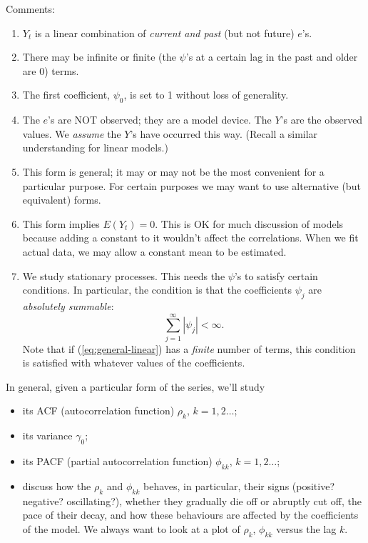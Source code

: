 \documentclass[12pt]{article}
\begin{document}
Comments:
\begin{enumerate}
\item
$Y_t$ is a linear combination of \emph{current and past} (but not
    future) $e$'s.

\item There may be infinite or finite
    (the $\psi$'s at a certain lag in the past and older are 0) terms.

\item The first coefficient, $\psi_0$, is set to 1 without loss of
    generality.

\item The $e$'s are NOT observed; they are a model device.
   The $Y$'s are the observed values.
   We \emph{assume} the $Y$'s have occurred this way.
   (Recall a similar understanding for linear models.)

\item This form is general; it may or may not be the most convenient for a
    particular purpose. For certain purposes we may want to use
    alternative (but equivalent) forms.

\item This form implies $E(Y_t) = 0$.
   This is OK for much discussion of models because adding a constant to it
   wouldn't affect the correlations.
   When we fit actual data, we may allow a constant mean to be
   estimated.

\item We study stationary processes.
   This needs the $\psi$'s to satisfy certain conditions.
   In particular, the condition is that
   the coefficients $\psi_j$ are \emph{absolutely summable}:
   \[
   \sum_{j=1}^\infty |\psi_j| < \infty.
   \]
   Note that
   if (\ref{eq:general-linear}) has a \emph{finite} number of terms,
   this condition is satisfied with whatever values of the coefficients.
\end{enumerate}

In general, given a particular form of the series, we'll study
\begin{itemize}
\item its ACF (autocorrelation function)  $\rho_k$, $k=1,2\dotsc$;
\item its variance $\gamma_0$;
\item its PACF (partial autocorrelation function)  $\phi_{kk}$, $k=1,2\dotsc$;
\item discuss how the $\rho_k$ and $\phi_{kk}$ behaves,
    in particular,
    their signs (positive? negative? oscillating?),
    whether they gradually die off or abruptly cut off,
    the pace of their decay,
    and how these behaviours are affected by the coefficients of the
    model.
    We always want to look at a plot of $\rho_k$, $\phi_{kk}$
    versus the lag $k$.
\end{itemize}
\end{document}
